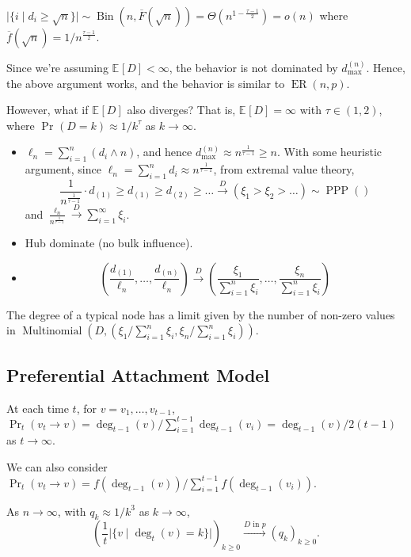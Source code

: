 \begin{note}
	\(\lvert \{ i \mid d_i \geq \sqrt{n} \} \rvert \sim \operatorname{Bin}(n, \overline{F} (\sqrt{n} )) = \Theta (n^{1 - \frac{\tau - 1}{2}}) = o(n)\) where \(\overline{f} (\sqrt{n} ) = 1 / n^{\frac{\tau -1}{2}}\).
\end{note}

\begin{intuition}
	Since we're assuming \(\mathbb{E}_{}[D] < \infty \), the behavior is not dominated by \(d_{\max }^{(n)}\). Hence, the above argument works, and the behavior is similar to \(\operatorname{ER}(n, p) \).
\end{intuition}

However, what if \(\mathbb{E}_{}[D] \) also diverges? That is, \(\mathbb{E}_{}[D] = \infty \) with \(\tau \in (1, 2)\), where \(\Pr_{}\left(D = k\right) \approx 1 / k^{\tau }\) as \(k \to \infty \).
\begin{itemize}
	\item \(\ell _n = \sum_{i=1}^{n} (d_i \land n)\), and hence \(d_{\max }^{(n)} \approx n^{\frac{1}{\tau - 1}} \geq n\). With some heuristic argument, since \(\ell _n = \sum_{i=1}^{n} d_i \approx n^{\frac{1}{\tau -1}}\), from extremal value theory,
	      \[
		      \frac{1}{n^{\frac{1}{\tau -1}}} \cdot d_{(1)}
		      \geq d_{(1)}
		      \geq d_{(2)}
		      \geq \dots
		      \overset{D}{\to} (\xi _1 > \xi _2 > \dots ) \sim \operatorname{PPP}( )
	      \]
	      and \(\frac{\ell _n}{n^{\frac{1}{\tau -1}}} \overset{D}{\to} \sum_{i=1}^{\infty } \xi _i\).
	\item Hub dominate (no bulk influence).
	\item
	      \[
		      \left( \frac{d_{(1)}}{\ell _n}, \dots , \frac{d_{(n)}}{\ell _n} \right)
		      \overset{D}{\to} \left( \frac{\xi _1}{\sum_{i=1}^{n} \xi _i} , \dots , \frac{\xi _n}{\sum_{i=1}^{n} \xi _i}\right)
	      \]
\end{itemize}

\begin{theorem}
	The degree of a typical node has a limit given by the number of non-zero values in \(\operatorname{Multinomial}(D, (\xi _1 / \sum_{i=1}^{n} \xi _i, \xi _n / \sum_{i=1}^{n} \xi _i)) \).
\end{theorem}

\subsection{Preferential Attachment Model}
At each time \(t\), for \(v = v_1, \dots , v_{t-1}\), \(\Pr_{t}\left(v_t \to v\right) = \deg _{t-1}(v) / \sum_{i=1}^{t-1} \deg _{t-1} (v_i) = \deg _{t-1}(v) / 2(t-1)\) as \(t \to \infty \).

\begin{note}
	We can also consider \(\Pr_{t}\left(v_t \to v\right) = f(\deg _{t-1} (v)) / \sum_{i=1}^{t-1} f(\deg _{t-1}(v_i))\).
\end{note}

\begin{theorem}
	As \(n \to \infty \), with \(q_k \approx 1 / k^3\) as \(k \to \infty \),
	\[
		\left( \frac{1}{t} \lvert \{ v \mid \deg _t(v) = k \} \rvert  \right) _{k \geq 0}
		\overset{D \text{ in } p}{\to} (q_k)_{k\geq 0}.
	\]
\end{theorem}